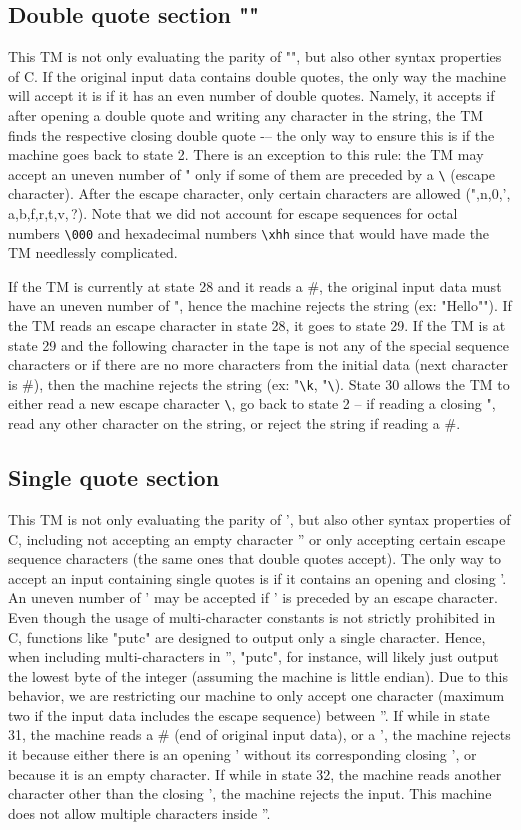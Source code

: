 \documentclass{article}
\begin{document}
\subsection{Double quote section ""}
This TM is not only evaluating the parity of "", but also other syntax properties of C. If the original input data contains double quotes, 
the only way the machine will accept it is if it has an even number of double quotes. Namely, it accepts if after opening a double quote and writing 
any character in the string, the TM finds the respective closing double quote -– the only way to ensure this is if the machine goes back to state 2. 
There is an exception to this rule: the TM may accept an uneven number of " only if some of them are preceded by a \verb|\| (escape character). 
After the escape character, only certain characters are allowed (",n,0,', a,b,f,r,t,v,\,?). Note that we did not account for escape sequences for octal 
numbers \verb|\000| and hexadecimal numbers \verb|\xhh| since that would have made the TM needlessly complicated.

If the TM is currently at state 28 and it reads a $\#$, the original input data must have an uneven number of ", hence the machine rejects the string (ex: "Hello""). 
If the TM reads an escape character in state 28, it goes to state 29. If the TM is at state 29 and the following character in the tape is not any of 
the special sequence characters or if there are no more characters from the initial data (next character is $\#$), then the machine rejects the string 
(ex: "\verb|\k|, "\verb|\|). State 30 allows the TM to either read a new escape character \verb|\|, go back to state 2 -- if reading a closing ", read any other character
on the string, or reject the string if reading a $\#$. 

\subsection{Single quote section}

This TM is not only evaluating the parity of ', but also other syntax properties of C, including not accepting an empty character '' or only accepting certain escape 
sequence characters (the same ones that double quotes accept). The only way to accept an input containing single quotes is if it contains an opening and closing '. 
An uneven number of ' may be accepted if ' is preceded by an escape character. Even though the usage of multi-character constants is not strictly prohibited in C,
functions like "putc" are designed to output only a single character. Hence, when including multi-characters in '', "putc", for instance, will likely just output the 
lowest byte of the integer (assuming the machine is little endian). Due to this behavior, we are restricting our machine to only accept one character (maximum two if the 
input data includes the escape sequence) between ''. If while in state 31, the machine reads a $\#$ (end of original input data), or a ', the machine rejects it because 
either there is an opening ' without its corresponding closing ', or because it is an empty character. If while in state 32, the machine reads another character 
other than the closing ', the machine rejects the input. This machine does not allow multiple characters inside ''. 
\end{document}
